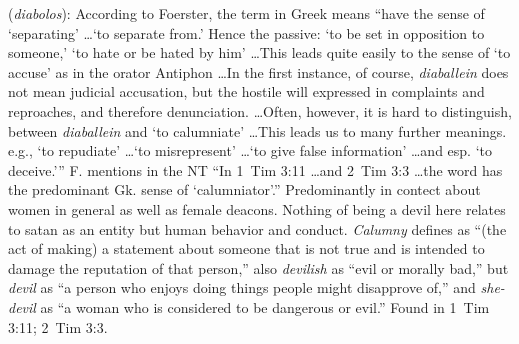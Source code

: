 \item[She-devil,]

(\textit{diabolos}):
According to Foerster, the term in Greek means ``have the sense of `separating' \ldots `to separate from.' Hence the passive: `to be set in opposition to someone,' `to hate or be hated by him' \ldots This leads quite easily to the sense of `to accuse' as in the orator Antiphon \ldots In the first instance, of course, \emph{diaballein} does not mean judicial accusation, but the hostile will expressed in complaints and reproaches, and therefore denunciation. \ldots Often, however, it is hard to distinguish, between \emph{diaballein} and `to calumniate' \ldots This leads us to many further meanings. e.g., `to repudiate' \ldots `to misrepresent' \ldots `to give false information' \ldots and esp. `to deceive.'''  
F. mentions in the NT ``In 1~Tim 3:11 \ldots and 2~Tim 3:3 \ldots the word has the predominant Gk. sense of `calumniator'.''  
Predominantly in contect about women in general as well as female deacons. Nothing of being a devil here relates to satan as an entity but human behavior and conduct. \emph{Calumny} defines as ``(the act of making) a statement about someone that is not true and is intended to damage the reputation of that person,'' also \emph{devilish} as ``evil or morally bad,'' but \emph{devil} as ``a person who enjoys doing things people might disapprove of,'' and \emph{she-devil} as ``a woman who is considered to be dangerous or evil.''
Found in 1~Tim 3:11; 2~Tim 3:3.
